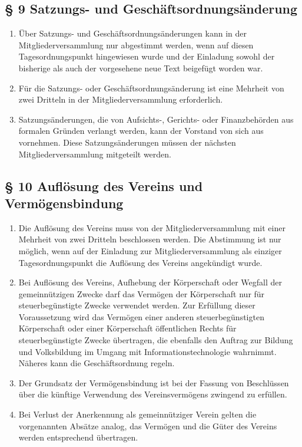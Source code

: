 \documentclass[10pt,a4paper]{scrartcl}
\begin{document}
\subsection*{§ 9 Satzungs- und Geschäftsordnungsänderung}
\begin{enumerate}
	\item Über Satzungs- und Geschäftsordnungsänderungen kann in der Mitgliederversammlung
		nur abgestimmt werden, wenn auf diesen Tagesordnungspunkt hingewiesen wurde und der
		Einladung sowohl der bisherige als auch der vorgesehene neue Text beigefügt
		worden war.
	\item Für die Satzungs- oder Geschäftsordnungsänderung ist eine Mehrheit von zwei
		Dritteln in der Mitgliederversammlung erforderlich.
	\item Satzungsänderungen, die von Aufsichts-, Gerichts- oder Finanz\-be\-hör\-den aus formalen
		Grün\-den verlangt werden, kann der Vorstand von sich aus vornehmen. Diese
		Sat\-zungs\-än\-der\-ung\-en müs\-sen der nächs\-ten Mitgliederversammlung mitgeteilt
		werden.
\end{enumerate}
\subsection*{§ 10 Auflösung des Vereins und Vermögensbindung}
\begin{enumerate}
	\item Die Auflösung des Vereins muss von der Mitgliederversammlung mit einer Mehrheit von
		zwei Dritteln beschlossen werden. Die Abstimmung ist nur möglich, wenn auf der Einladung
		zur Mitgliederversammlung als einziger Tagesordnungspunkt die Auflösung des Vereins
		angekündigt wurde.
	\item Bei Auflösung des Vereins, Aufhebung der Körperschaft oder Wegfall der
		gemeinnützigen Zwecke darf das Vermögen der Körperschaft nur für
		steuerbegünstigte Zwecke verwendet werden. Zur Erfüllung dieser
		Voraussetzung wird das Vermögen einer anderen steu\-er\-be\-güns\-tig\-ten
		Körperschaft oder einer Körperschaft öffentlichen Rechts für
		steuerbegünstigte Zwecke über\-tra\-gen, die ebenfalls den Auftrag
		zur Bildung und Volksbildung im Umgang mit Informationstechnologie
		wahrnimmt. Nä\-he\-res kann die Geschäftsordnung regeln.
	\item Der Grundsatz der Vermögensbindung ist bei der Fassung von
		Beschlüssen über die künf\-ti\-ge Verwendung des Vereinsvermögens zwingend
		zu erfüllen.
	\item Bei Verlust der Anerkennung als gemeinnütziger Verein gelten die vorgenannten Absätze analog, 
		das Vermögen und die Güter des Vereins werden entsprechend übertragen.
\end{enumerate}
\end{document}
